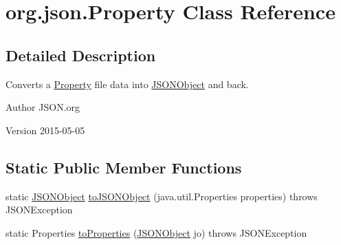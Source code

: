 \hypertarget{classorg_1_1json_1_1Property}{\section{org.\-json.\-Property Class Reference}
\label{classorg_1_1json_1_1Property}
}


\subsection{Detailed Description}
Converts a \hyperlink{classorg_1_1json_1_1Property}{Property} file data into \hyperlink{classorg_1_1json_1_1JSONObject}{J\-S\-O\-N\-Object} and back. \begin{DoxyAuthor}{Author}
J\-S\-O\-N.\-org 
\end{DoxyAuthor}
\begin{DoxyVersion}{Version}
2015-\/05-\/05 
\end{DoxyVersion}
\subsection*{Static Public Member Functions}
\begin{DoxyCompactItemize}
\item 
static \hyperlink{classorg_1_1json_1_1JSONObject}{J\-S\-O\-N\-Object} \hyperlink{classorg_1_1json_1_1Property_aaf04335208523a4f7b41eb9edf3939fb}{to\-J\-S\-O\-N\-Object} (java.\-util.\-Properties properties)  throws J\-S\-O\-N\-Exception 
\item 
static Properties \hyperlink{classorg_1_1json_1_1Property_adbaf75a2454e0563ba90f9adc2822850}{to\-Properties} (\hyperlink{classorg_1_1json_1_1JSONObject}{J\-S\-O\-N\-Object} jo)  throws J\-S\-O\-N\-Exception 
\end{DoxyCompactItemize}


